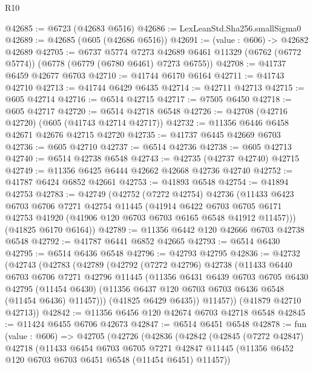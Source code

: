 \begin{lexlean}{R10}
\begin{coremodule}
@42685 := @6723 (@42683 @6516)
@42686 := LexLeanStd.Sha256.smallSigma0
@42689 := @42685 (@605 (@42686 @6516))
@42691 := (value : @606) -> @42682 @42689
@42705 := @6737
    @5774
    @7273
    @42689
    @6461
    @11329
    (@6762 (@6772 @5774))
    (@6778 (@6779 (@6780 @6461) @7273 @6755))
@42708 := @41737 @6459 @42677 @6703
@42710 := @41744 @6170 @6164
@42711 := @41743 @42710
@42713 := @41744 @6429 @6435
@42714 := @42711 @42713
@42715 := @605 @42714
@42716 := @6514 @42715
@42717 := @7505 @6450
@42718 := @605 @42717
@42720 := @6514 @42718 @6548
@42726 := @42708 (@42716 @42720) (@605 (@41743 @42714 @42717))
@42732 := @11356 @6446 @6458 @42671 @42676 @42715 @42720
@42735 := @41737 @6445 @42669 @6703
@42736 := @605 @42710
@42737 := @6514 @42736
@42738 := @605 @42713
@42740 := @6514 @42738 @6548
@42743 := @42735 (@42737 @42740) @42715
@42749 := @11356 @6425 @6444 @42662 @42668 @42736 @42740
@42752 := @41787 @6424 @6852 @42661
@42753 := @41893 @6548
@42754 := @41894 @42753
@42783 := @42749
    (@42752
      (@7272 @42754)
      @42736
      (@11433
        @6423
        @6703
        @6706
        @7271
        @42754
        @11445
        (@41914
          @6422
          @6703
          @6705
          @6171
          @42753
          @41920
          (@41906 @120 @6703 @6703 @6165 @6548 @41912 @11457)))
      (@41825 @6170 @6164))
@42789 := @11356 @6442 @120 @42666 @6703 @42738 @6548
@42792 := @41787 @6441 @6852 @42665
@42793 := @6514 @6430
@42795 := @6514 @6436 @6548
@42796 := @42793 @42795
@42836 := @42732
    (@42743
      (@42783
        (@42789
          (@42792
            (@7272 @42796)
            @42738
            (@11433
              @6440
              @6703
              @6706
              @7271
              @42796
              @11445
              (@11356
                @6431
                @6439
                @6703
                @6705
                @6430
                @42795
                (@11454 @6430)
                (@11356 @6437 @120 @6703 @6703 @6436 @6548 (@11454 @6436) @11457)))
            (@41825 @6429 @6435))
          @11457))
      (@41879 @42710 @42713))
@42842 := @11356 @6456 @120 @42674 @6703 @42718 @6548
@42845 := @11424 @6455 @6706 @42673
@42847 := @6514 @6451 @6548
@42878 := fun (value : @606) =>
  @42705
    (@42726
      (@42836
        (@42842
          (@42845
            (@7272 @42847)
            @42718
            (@11433
              @6454
              @6703
              @6705
              @7271
              @42847
              @11445
              (@11356 @6452 @120 @6703 @6703 @6451 @6548 (@11454 @6451) @11457))

\end{coremodule}
\end{lexlean}
